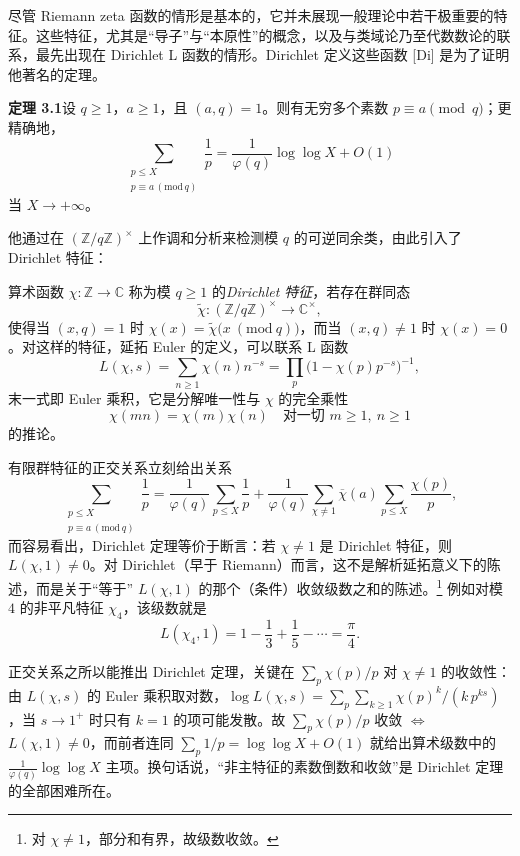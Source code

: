 尽管 Riemann zeta 函数的情形是基本的，它并未展现一般理论中若干极重要的特征。这些特征，尤其是“导子”与“本原性”的概念，以及与类域论乃至代数数论的联系，最先出现在 Dirichlet L 函数的情形。Dirichlet 定义这些函数 [Di] 是为了证明他著名的定理。

\par\medskip\noindent\textbf{定理 3.1}\quad 设 $q\ge 1$，$a\ge 1$，且 $(a,q)=1$。则有无穷多个素数 $p\equiv a\pmod q$；更精确地，
\[
\sum_{\substack{p\le X\\ p\equiv a\,(\mathrm{mod}\,q)}}\frac{1}{p}
=\frac{1}{\varphi(q)}\log\log X+O(1)
\]
当 $X\to+\infty$。

他通过在 $(\mathbb{Z}/q\mathbb{Z})^{\times}$ 上作调和分析来检测模 $q$ 的可逆同余类，由此引入了 Dirichlet 特征：

算术函数 $\chi\colon\mathbb{Z}\to\mathbb{C}$ 称为模 $q\ge 1$ 的\emph{Dirichlet 特征}，若存在群同态
\[
\tilde\chi\colon(\mathbb{Z}/q\mathbb{Z})^{\times}\to\mathbb{C}^{\times},
\]
使得当 $(x,q)=1$ 时 $\chi(x)=\tilde\chi\bigl(x\ (\mathrm{mod}\ q)\bigr)$，而当 $(x,q)\neq 1$ 时 $\chi(x)=0$。对这样的特征，延拓 Euler 的定义，可以联系 L 函数
\[
L(\chi,s)=\sum_{n\ge 1}\chi(n)n^{-s}=\prod_{p}\bigl(1-\chi(p)p^{-s}\bigr)^{-1},
\]
末一式即 Euler 乘积，它是分解唯一性与 $\chi$ 的完全乘性
\[
\chi(mn)=\chi(m)\chi(n)\quad\text{对一切 } m\ge 1,\ n\ge 1
\]
的推论。

有限群特征的正交关系立刻给出关系
\[
\sum_{\substack{p\le X\\ p\equiv a\,(\mathrm{mod}\,q)}}\frac{1}{p}
=\frac{1}{\varphi(q)}\sum_{p\le X}\frac{1}{p}
+\frac{1}{\varphi(q)}\sum_{\chi\neq 1}\overline{\chi}(a)\sum_{p\le X}\frac{\chi(p)}{p},
\]
而容易看出，Dirichlet 定理等价于断言：若 $\chi\neq 1$ 是 Dirichlet 特征，则 $L(\chi,1)\neq 0$。对 Dirichlet（早于 Riemann）而言，这不是解析延拓意义下的陈述，而是关于“等于” $L(\chi,1)$ 的那个（条件）收敛级数之和的陈述。\footnote{对 $\chi\neq 1$，部分和有界，故级数收敛。} 例如对模 $4$ 的非平凡特征 $\chi_4$，该级数就是
\[
L(\chi_4,1)=1-\frac{1}{3}+\frac{1}{5}-\cdots=\frac{\pi}{4}.
\]

\begin{annote}
正交关系之所以能推出 Dirichlet 定理，关键在 $\sum_p\chi(p)/p$ 对 $\chi\neq 1$ 的收敛性：由 $L(\chi,s)$ 的 Euler 乘积取对数，$\log L(\chi,s)=\sum_p\sum_{k\ge 1}\chi(p)^{k}/(k\,p^{ks})$，当 $s\to 1^{+}$ 时只有 $k=1$ 的项可能发散。故 $\sum_p\chi(p)/p$ 收敛 $\iff$ $L(\chi,1)\neq 0$，而前者连同 $\sum_p 1/p=\log\log X+O(1)$ 就给出算术级数中的 $\tfrac1{\varphi(q)}\log\log X$ 主项。换句话说，“非主特征的素数倒数和收敛”是 Dirichlet 定理的全部困难所在。
\par\vspace{0.15em}{\raggedleft 【来源：Serre《A Course in Arithmetic》Ch.~VI \S2（A）】\par}
\end{annote}

